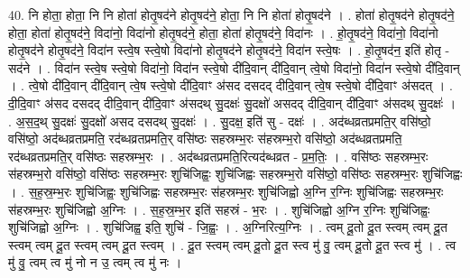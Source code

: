 \documentclass[17pt]{extarticle}
\begin{document}
40. नि होता॒ होता॒ नि नि होता॑ होतृ॒षद॑ने होतृ॒षद॑ने॒ होता॒ नि नि होता॑ होतृ॒षद॑ने । . होता॑ होतृ॒षद॑ने होतृ॒षद॑ने॒ होता॒ होता॑ होतृ॒षद॑ने॒ विदा॑नो॒ विदा॑नो होतृ॒षद॑ने॒ होता॒ होता॑ होतृ॒षद॑ने॒ विदा॑नः । . हो॒तृ॒षद॑ने॒ विदा॑नो॒ विदा॑नो होतृ॒षद॑ने होतृ॒षद॑ने॒ विदा॑न स्त्वे॒ष स्त्वे॒षो विदा॑नो होतृ॒षद॑ने होतृ॒षद॑ने॒ विदा॑न स्त्वे॒षः । . हो॒तृ॒षद॑न॒ इति॑ होतृ - सद॑ने । . विदा॑न स्त्वे॒ष स्त्वे॒षो विदा॑नो॒ विदा॑न स्त्वे॒षो दी॑दि॒वान् दी॑दि॒वान् त्वे॒षो विदा॑नो॒ विदा॑न स्त्वे॒षो दी॑दि॒वान् । . त्वे॒षो दी॑दि॒वान् दी॑दि॒वान् त्वे॒ष स्त्वे॒षो दी॑दि॒वाꣳ अ॑सद दसदद् दीदि॒वान् त्वे॒ष स्त्वे॒षो दी॑दि॒वाꣳ अ॑सदत् । . दी॒दि॒वाꣳ अ॑सद दसदद् दीदि॒वान् दी॑दि॒वाꣳ अ॑सदथ् सु॒दक्षः॑ सु॒दक्षो॑ असदद् दीदि॒वान् दी॑दि॒वाꣳ अ॑सदथ् सु॒दक्षः॑ । . अ॒स॒द॒थ् सु॒दक्षः॑ सु॒दक्षो॑ असद दसदथ् सु॒दक्षः॑ । . सु॒दक्ष॒ इति॑ सु - दक्षः॑ । . अद॑ब्धव्रतप्रमति॒र् वसि॑ष्ठो॒ वसि॑ष्ठो॒ अद॑ब्धव्रतप्रमति॒ रद॑ब्धव्रतप्रमति॒र् वसि॑ष्ठः सहस्रम्भ॒रः स॑हस्रम्भ॒रो वसि॑ष्ठो॒ अद॑ब्धव्रतप्रमति॒ रद॑ब्धव्रतप्रमति॒र् वसि॑ष्ठः सहस्रम्भ॒रः । . अद॑ब्धव्रतप्रमति॒रित्यद॑ब्धव्रत - प्र॒म॒तिः॒ । . वसि॑ष्ठः सहस्रम्भ॒रः स॑हस्रम्भ॒रो वसि॑ष्ठो॒ वसि॑ष्ठः सहस्रम्भ॒रः शुचि॑जिह्वः॒ शुचि॑जिह्वः सहस्रम्भ॒रो वसि॑ष्ठो॒ वसि॑ष्ठः सहस्रम्भ॒रः शुचि॑जिह्वः । . स॒ह॒स्र॒म्भ॒रः शुचि॑जिह्वः॒ शुचि॑जिह्वः सहस्रम्भ॒रः स॑हस्रम्भ॒रः शुचि॑जिह्वो अ॒ग्नि र॒ग्निः शुचि॑जिह्वः सहस्रम्भ॒रः स॑हस्रम्भ॒रः शुचि॑जिह्वो अ॒ग्निः । . स॒ह॒स्र॒म्भ॒र इति॑ सहस्रं - भ॒रः । . शुचि॑जिह्वो अ॒ग्नि र॒ग्निः शुचि॑जिह्वः॒ शुचि॑जिह्वो अ॒ग्निः । . शुचि॑जिह्व॒ इति॒ शुचि॑ - जि॒ह्वः॒ । . अ॒ग्निरित्य॒ग्निः । . त्वम् दू॒तो दू॒त स्त्वम् त्वम् दू॒त स्त्वम् त्वम् दू॒त स्त्वम् त्वम् दू॒त स्त्वम् । . दू॒त स्त्वम् त्वम् दू॒तो दू॒त स्त्व मु॑ वु॒ त्वम् दू॒तो दू॒त स्त्व मु॑ । . त्व मु॑ वु॒ त्वम् त्व मु॑ नो न उ॒ त्वम् त्व मु॑ नः । \newline
\pagebreak
{}
\end{document}
